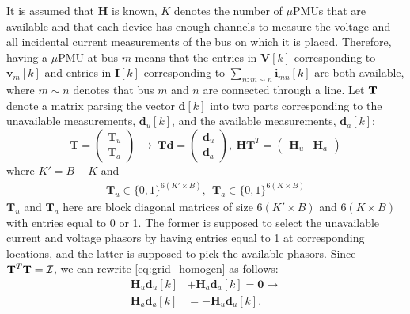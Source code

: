 \documentclass[twocolumn]{IEEEtran}
\newcommand{\mup}{\mu \text{PMU}}
\newcommand{\mb}{\mathbf}
\begin{document}
It is assumed that $\mathbf{H}$ is known, $K$ denotes the number of $\mup$s that are available and that each device has enough channels to measure the voltage and all incidental current measurements of the bus on which it is placed. Therefore, having a $\mup$ at bus $m$ means that the entries in $\mb{V}[k]$ corresponding to $\mb{v}_m[k]$  and entries in $\mb{I}[k]$ corresponding to $\sum_{n:m \sim n} \mb{i}_{mn}[k]$ are both available, where $m \sim n$ denotes that bus $m$ and $n$ are connected through a line. %
Let ${\bf T}$ denote a matrix parsing the vector $\mathbf d[k]$ into two parts corresponding to the unavailable measurements, $\mathbf{d}_u[k]$, and the available measurements, $\mathbf{d}_a[k]$:
\begin{equation}
{\mathbf T}=
\begin{pmatrix}
{\mathbf T}_u\\
{\mathbf T}_a
\end{pmatrix}
~\rightarrow~ 
{\mathbf T}\mathbf d=\begin{pmatrix}
{\mathbf d}_u\\
{\mathbf d}_a
\end{pmatrix},
~\mathbf{H}{\mathbf T}^T=
\left(\!\!
\begin{array}{c|c}
{\mathbf H}_u&{\mathbf H}_a
\end{array}\!\!
\right)
\end{equation}
where $K'=B-K$ and
\begin{align}
 \mb{T}_u \in \{0,1\}^{6(K' \times B)},~~
 \mb{T}_a \in \{0,1\}^{6(K \times B)}
\end{align}
$\mb{T}_u$ and $\mb{T}_a$ here are block diagonal matrices of size $6(K' \times B)$ and $6(K \times B)$ with entries equal to 0 or 1. The former is supposed to select the unavailable current and voltage phasors by having entries equal to 1 at corresponding locations, and the latter is supposed to pick the available phasors. Since ${\mathbf T}^T{\mathbf T}={\cal I}$, we can rewrite \eqref{eq:grid_homogen} as follows:
\begin{subequations}
\begin{align}
\label{eq:split_grid_homogen_1}
\mathbf{H}_u\mathbf{d}_u[k]&+\mathbf{H}_a\mathbf{d}_a[k]=\mathbf{0} \rightarrow \\
\mathbf{H}_a\mathbf{d}_a[k]&=-\mathbf{H}_u\mathbf{d}_u[k].
\label{eq:split_grid_homogen_2}
\end{align}
\end{subequations}
\end{document}
